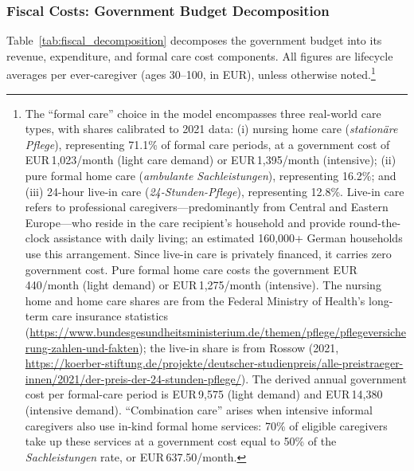 \subsubsection{Fiscal Costs: Government Budget Decomposition}
\label{subsubsec:fiscal_decomposition}

Table~\ref{tab:fiscal_decomposition} decomposes the government budget into its revenue, expenditure, and formal care cost components. All figures are lifecycle averages per ever-caregiver (ages 30--100, in EUR), unless otherwise noted.\footnote{The ``formal care'' choice in the model encompasses three real-world care types, with shares calibrated to 2021 data: (i) nursing home care (\textit{station\"are Pflege}), representing 71.1\% of formal care periods, at a government cost of EUR\,1,023/month (light care demand) or EUR\,1,395/month (intensive); (ii) pure formal home care (\textit{ambulante Sachleistungen}), representing 16.2\%; and (iii) 24-hour live-in care (\textit{24-Stunden-Pflege}), representing 12.8\%. Live-in care refers to professional caregivers---predominantly from Central and Eastern Europe---who reside in the care recipient's household and provide round-the-clock assistance with daily living; an estimated 160,000+ German households use this arrangement. Since live-in care is privately financed, it carries zero government cost. Pure formal home care costs the government EUR\,440/month (light demand) or EUR\,1,275/month (intensive). The nursing home and home care shares are from the Federal Ministry of Health's long-term care insurance statistics (\url{https://www.bundesgesundheitsministerium.de/themen/pflege/pflegeversicherung-zahlen-und-fakten}); the live-in share is from Rossow (2021, \url{https://koerber-stiftung.de/projekte/deutscher-studienpreis/alle-preistraeger-innen/2021/der-preis-der-24-stunden-pflege/}). The derived annual government cost per formal-care period is EUR\,9,575 (light demand) and EUR\,14,380 (intensive demand). ``Combination care'' arises when intensive informal caregivers also use in-kind formal home services: 70\% of eligible caregivers take up these services at a government cost equal to 50\% of the \textit{Sachleistungen} rate, or EUR\,637.50/month.}

